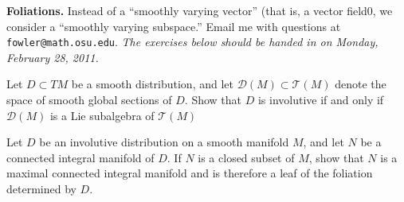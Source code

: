 \documentclass[12pt]{pset}
\author{Jim Fowler}
\date{Winter 2011}
\begin{document}
\maketitle

\noindent\textbf{Foliations.}  Instead of a ``smoothly varying
vector'' (that is, a vector field0, we consider a ``smoothly varying subspace.''
Email me with questions at \texttt{fowler@math.osu.edu}.  \textit{The
  exercises below should be handed in on Monday, February 28, 2011.}

\begin{problem}[Lee 19--3]

  Let $D \subset TM$ be a smooth distribution, and let $\mathcal D(M)
  \subset \mathcal T(M)$ denote the space of smooth global sections of
  $D$.  Show that $D$ is involutive if and only if $\mathcal D(M)$ is
  a Lie subalgebra of $\mathcal T(M)$

\end{problem}

\vfill

\begin{problem}[Lee 19--12]

Let $D$ be an involutive distribution on a smooth manifold $M$, and
let $N$ be a connected integral manifold of $D$.  If $N$ is a closed
subset of $M$, show that $N$ is a maximal connected integral manifold
and is therefore a leaf of the foliation determined by $D$.

\end{problem}

\vfill
\vfill
\vfill

\pagebreak

\null
\end{document}
